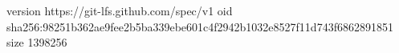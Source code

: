 version https://git-lfs.github.com/spec/v1
oid sha256:98251b362ae9fee2b5ba339ebe601c4f2942b1032e8527f11d743f6862891851
size 1398256
